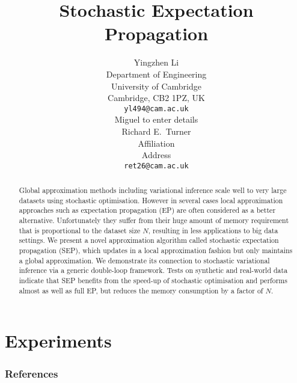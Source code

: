 \documentclass{article} %
\title{Stochastic Expectation Propagation}
\author{
Yingzhen Li \\
Department of Engineering\\
University of Cambridge\\
Cambridge, CB2 1PZ, UK \\
\texttt{yl494@cam.ac.uk} \\
\And
Miguel to enter details\\
\And
Richard E.~Turner \\
Affiliation \\
Address \\
\texttt{ret26@cam.ac.uk} \\
}
\begin{document}
\maketitle

\begin{abstract}
Global approximation methods including variational inference scale well to very large datasets using stochastic optimisation. However in several cases local approximation approaches such as expectation propagation (EP) are often considered as a better alternative. Unfortunately they suffer from their huge amount of memory requirement that is proportional to the dataset size $N$, resulting in less applications to big data settings. We present a novel approximation algorithm called stochastic expectation propagation (SEP), which updates in a local approximation fashion but only maintains a global approximation. We demonstrate its connection to stochastic variational inference via a generic double-loop framework. Tests on synthetic and real-world data indicate that SEP benefits from the speed-up of stochastic optimisation and performs almost as well as full EP, but reduces the memory consumption by a factor of $N$. 
\end{abstract}










\section{Experiments}






\subsubsection*{References}
\renewcommand{\section}[2]{}


\end{document}

